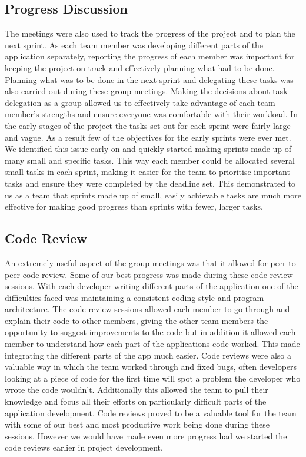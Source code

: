 \documentclass{l3proj}
\begin{document}
\subsection{Progress Discussion}
The meetings were also used to track the progress of the project and to plan the next sprint. As each team member was developing different parts of the application separately, reporting the progress of each member was important for keeping the project on track and effectively planning what had to be done. Planning what was to be done in the next sprint and delegating these tasks was also carried out during these group meetings. Making the decisions about task delegation as a group allowed us to effectively take advantage of each team member’s strengths and ensure everyone was comfortable with their workload. In the early stages of the project the tasks set out for each sprint were fairly large and vague. As a result few of the objectives for the early sprints were ever met. We identified this issue early on and quickly started making sprints made up of many small and specific tasks. This way each member could be allocated several small tasks in each sprint, making it easier for the team to prioritise important tasks and ensure they were completed by the deadline set. This demonstrated to us as a team that sprints made up of small, easily achievable tasks are much more effective for making good progress than sprints with fewer, larger tasks.

\subsection{Code Review}
An extremely useful aspect of the group meetings was that it allowed for peer to peer code review. Some of our best progress was made during these code review sessions. With each developer writing different parts of the application one of the difficulties faced was maintaining a consistent coding style and program architecture. The code review sessions allowed each member to go through and explain their code to other members, giving the other team members the opportunity to suggest improvements to the code but in addition it allowed each member to understand how each part of the applications code worked. This made integrating the different parts of the app much easier. Code reviews were also a valuable way in which the team worked through and fixed bugs, often developers looking at a piece of code for the first time will spot a problem the developer who wrote the code wouldn’t. Additionally this allowed the team to pull their knowledge and focus all their efforts on particularly difficult parts of the application development. Code reviews proved to be a valuable tool for the team with some of our best and most productive work being done during these sessions. However we would have made even more progress had we started the code reviews earlier in project development.
\end{document}
